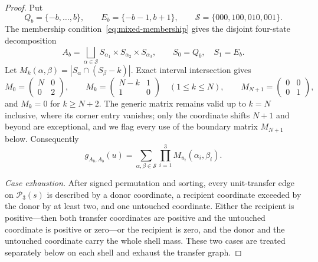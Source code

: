 \documentclass[pdflatex,sn-mathphys-num]{sn-jnl}
\theoremstyle{thmstyleone}
\theoremstyle{thmstylethree}
\theoremstyle{thmstyletwo}
\begin{document}
\begin{proof}
Put
\[
 Q_b=\{-b,\ldots,b\},\qquad E_b=\{-b-1,b+1\},\qquad
 \mathcal S=\{000,100,010,001\}.
\]
The membership condition~\eqref{eq:mixed-membership} gives the disjoint
four-state decomposition
\[
 A_b=\bigsqcup_{\alpha\in\mathcal S}
 S_{\alpha_1}\times S_{\alpha_2}\times S_{\alpha_3},
 \qquad S_0=Q_b,\quad S_1=E_b.
\]
Let $M_k(\alpha,\beta)=|S_\alpha\cap(S_\beta-k)|$.  Exact interval
intersection gives
\begin{equation}
 M_0=\begin{pmatrix}N&0\\0&2\end{pmatrix},\qquad
 M_k=\begin{pmatrix}N-k&1\\1&0\end{pmatrix}\quad(1\le k\le N),\qquad
 M_{N+1}=\begin{pmatrix}0&0\\0&1\end{pmatrix},        \label{eq:mixed-matrices}
\end{equation}
and $M_k=0$ for $k\ge N+2$.  The generic matrix remains valid up to $k=N$
inclusive, where its corner entry vanishes; only the coordinate shifts
$N+1$ and beyond are exceptional, and we flag every use of the boundary
matrix $M_{N+1}$ below.  Consequently
\begin{equation}
 g_{A_b,A_b}(u)=
 \sum_{\alpha,\beta\in\mathcal S}
 \prod_{i=1}^3M_{u_i}(\alpha_i,\beta_i).             \label{eq:mixed-state-sum}
\end{equation}

\emph{Case exhaustion.}  After signed permutation and sorting, every
unit-transfer edge on $\mathcal P_3(s)$ is described by a donor coordinate, a
recipient coordinate exceeded by the donor by at least two, and one untouched
coordinate.  Either the recipient is positive---then both transfer
coordinates are positive and the untouched coordinate is positive or
zero---or the recipient is zero, and the donor and the untouched coordinate
carry the whole shell mass.  These two cases are treated separately below on
each shell and exhaust the transfer graph.


\end{proof}
\end{document}
